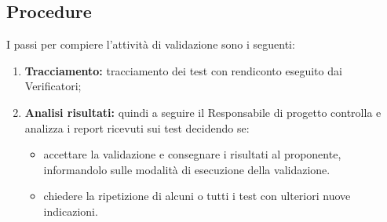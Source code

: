 \documentclass[NormeDiProgetto.tex]{subfiles}
\begin{document}
	\subsection{Procedure}
		I passi per compiere l’attività di validazione sono i seguenti:
		\begin{enumerate}
			\item \textbf{Tracciamento:} tracciamento dei test con rendiconto eseguito dai Verificatori;
			\item \textbf{Analisi risultati:} quindi a seguire il Responsabile di progetto controlla e analizza i report ricevuti sui test decidendo se:
			\begin{itemize}
				\item accettare la validazione e consegnare i risultati al proponente, informandolo sulle modalità di esecuzione della validazione.
				\item chiedere la ripetizione di alcuni o tutti i test con ulteriori nuove indicazioni.
			\end{itemize}
		\end{enumerate}

	 
	
	
\end{document}

